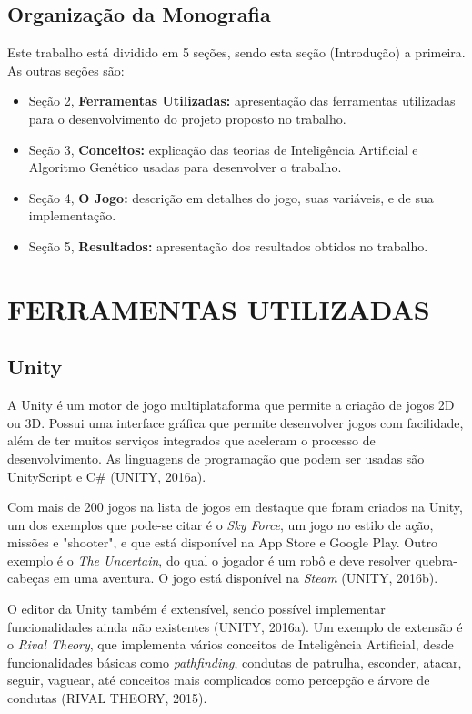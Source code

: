 \documentclass[12pt,a4paper]{article}
\begin{document}
	\subsection{Organização da Monografia}
		Este trabalho está dividido em 5 seções, sendo esta seção (Introdução) a primeira. As outras seções são:
		\begin{itemize}[noitemsep]
     		\item Seção 2, \textbf{Ferramentas Utilizadas:} apresentação das ferramentas utilizadas para o desenvolvimento do projeto proposto no trabalho.
     		\item Seção 3, \textbf{Conceitos:} explicação das teorias de Inteligência Artificial e Algoritmo Genético usadas para desenvolver o trabalho.
     		\item Seção 4, \textbf{O Jogo:} descrição em detalhes do jogo, suas variáveis, e de sua implementação.
     		\item Seção 5, \textbf{Resultados:} apresentação dos resultados obtidos no trabalho.
  	 	\end{itemize}

\newpage %
\section{FERRAMENTAS UTILIZADAS}

	\subsection{Unity}
		A Unity é um motor de jogo multiplataforma que permite a criação de jogos 2D ou 3D.
		Possui uma interface gráfica que permite desenvolver jogos com facilidade,
		além de ter muitos serviços integrados que aceleram o processo de desenvolvimento.
		As linguagens de programação que podem ser usadas são UnityScript e C\#
		(UNITY, 2016a).
		
		Com mais de 200 jogos na lista de jogos em destaque que foram criados na Unity,
		um dos exemplos que pode-se citar é o \textit{Sky Force},
		um jogo no estilo de ação, missões e "shooter",
		e que está disponível na App Store e Google Play.
		Outro exemplo é o \textit{The Uncertain},
		do qual o jogador é um robô e
		deve resolver quebra-cabeças em uma aventura.
		O jogo está disponível na \textit{Steam}
		(UNITY, 2016b).
		
		O editor da Unity também é extensível, sendo possível implementar funcionalidades ainda não existentes
		(UNITY, 2016a).
		Um exemplo de extensão é o \textit{Rival Theory},
		que implementa vários conceitos de Inteligência Artificial,
		desde funcionalidades básicas como \textit{pathfinding},
		condutas de patrulha, esconder, atacar, seguir, vaguear,
		até conceitos mais complicados como percepção e árvore de condutas
		(RIVAL THEORY, 2015).
		
\end{document}
